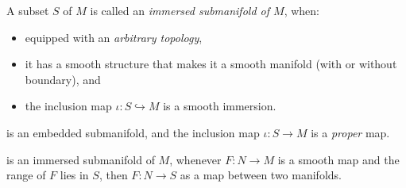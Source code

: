 \documentclass[../main-manifolds.tex]{subfiles}
\begin{document}
\begin{definition}\label{lee-chp5:immersed-submanifold}
    A subset $S$ of $M$ is called an \emph{immersed submanifold of $M$}, when:
    \begin{itemize}
        \item equipped with an \emph{arbitrary topology},
        \item it has a smooth structure that makes it a smooth manifold (with or without boundary), and
        \item the inclusion map $\iota: S\hookrightarrow M$ is a smooth immersion.
    \end{itemize}
\end{definition}


\begin{definition}\label{lee-chp5:properly-embedded-submanifold}
    is an embedded submanifold, and the inclusion map $\iota:S \to M$ is a \emph{proper} map. 
\end{definition}

\begin{definition}\label{lee-chp5:weakly-embedded-submanifold}
    is an immersed submanifold of $M$, whenever $F:N\to M$ is a smooth map and the range of $F$ lies in $S$, then $F:N\to S$ as a map between two manifolds.
\end{definition}
\end{document}
